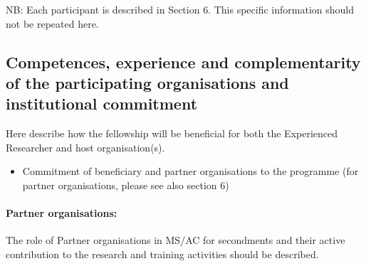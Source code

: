 NB: Each participant is described in Section 6. This specific information should not be repeated here.

\subsection{Competences, experience and complementarity of the participating organisations and institutional commitment}
\label{sec:competences}

Here describe how the fellowship will be beneficial for both the Experienced Researcher and host organisation(s).
\begin{itemize}
\item Commitment of beneficiary and partner organisations to the programme (for partner organisations, please see also section 6)
\end{itemize}

\paragraph{Partner organisations:}
The role of Partner organisations in MS/AC for secondments and their active contribution to the research and training activities should be described.
